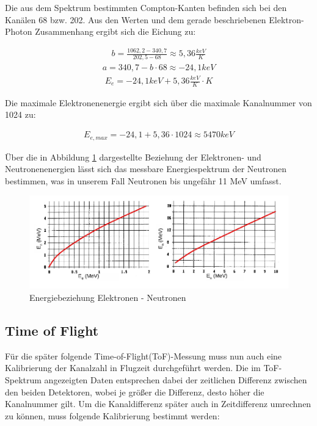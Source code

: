 Die aus dem Spektrum bestimmten Compton-Kanten befinden sich bei den Kanälen 68 bzw. 202. Aus den Werten und dem gerade beschriebenen Elektron-Photon Zusammenhang ergibt sich die Eichung zu:

\begin{align}
b= \frac{1062,2-340,7}{202,5-68} \approx 5,36 \frac{keV}{K}
\end{align}
\begin{align}
a=340,7-b\cdot 68 \approx -24,1 keV
\end{align}
\begin{align}
E_e=-24,1 keV +5,36 \frac{keV}{K} \cdot K
\end{align}

Die maximale Elektronenenergie ergibt sich über die maximale Kanalnummer von 1024 zu:

\begin{align}
E_{e,max}=-24,1 + 5,36 \cdot 1024 \approx 5470 keV 
\end{align}

Über die in Abbildung \ref{E-N} dargestellte Beziehung der Elektronen- und Neutronenenergien lässt sich das messbare Energiespektrum der Neutronen bestimmen, was in unserem Fall Neutronen bis ungefähr 11 MeV umfasst. 

\begin{figure}[htbp]  
     \includegraphics[width=1\textwidth]{E-N.png}
  \caption{Energiebeziehung Elektronen - Neutronen \cite{anleitung}}
  \label{E-N}
\end{figure}

\subsection{Time of Flight}

Für die später folgende Time-of-Flight(ToF)-Messung muss nun auch eine Kalibrierung der Kanalzahl in Flugzeit durchgeführt werden. Die im ToF-Spektrum angezeigten Daten entsprechen dabei der zeitlichen Differenz zwischen den beiden Detektoren, wobei je größer die Differenz, desto höher die Kanalnummer gilt. Um die Kanaldifferenz später auch in Zeitdifferenz umrechnen zu können, muss folgende Kalibrierung bestimmt werden:

